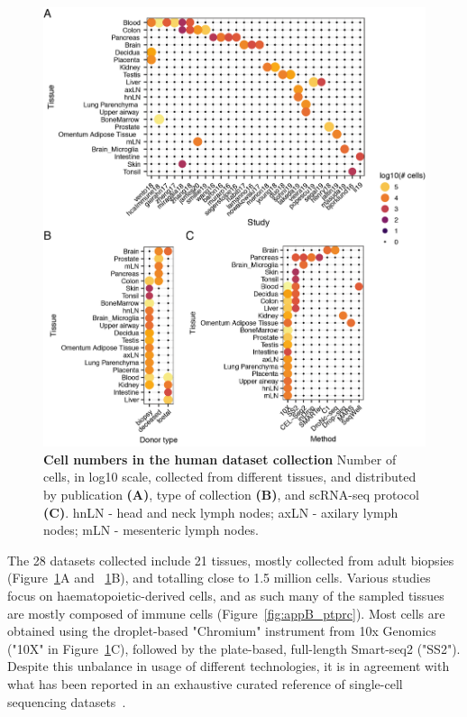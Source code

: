 \begin{figure}[ht!]
    \centering    
    \includegraphics[width=1.0\textwidth]{Chapter4/Figs/chap4_countsHumanAtlas.png} %
    \caption[Cell numbers in the human dataset collection]{\textbf{Cell numbers in the human dataset collection} \newline Number of cells, in log10 scale, collected from different tissues, and distributed by publication \textbf{(A)}, type of collection \textbf{(B)}, and scRNA-seq protocol \textbf{(C)}. hnLN - head and neck lymph nodes; axLN - axilary lymph nodes; mLN - mesenteric lymph nodes.}
    \label{fig:chap4_cha}
\end{figure}

The 28 datasets collected include 21 tissues, mostly collected from adult biopsies (Figure~\ref{fig:chap4_cha}A and ~\ref{fig:chap4_cha}B), and totalling close to 1.5 million cells. Various studies focus on haematopoietic-derived cells, and as such many of the sampled tissues are mostly composed of immune cells (Figure~\ref{fig:appB_ptprc}). Most cells are obtained using the droplet-based "Chromium" instrument from 10x Genomics ("10X" in Figure~\ref{fig:chap4_cha}C), followed by the plate-based, full-length Smart-seq2 ("SS2"). Despite this unbalance in usage of different technologies, it is in agreement with what has been reported in an exhaustive curated reference of single-cell sequencing datasets~\citep{svensson_curated_2019}.

